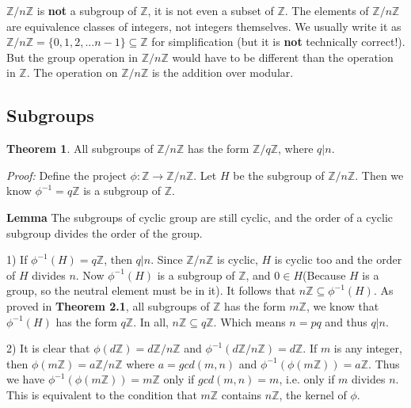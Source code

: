 \documentclass{article}
\theoremstyle{definition}
\newtheorem{theorem}{Theorem}[section]
\begin{document}
$\mathbb{Z}/n\mathbb{Z}$ is \textbf{not} a subgroup of $\mathbb{Z}$, it is not even a subset of $\mathbb{Z}$. The elements of $\mathbb{Z}/n\mathbb{Z}$ are equivalence classes of integers, not integers themselves. We usually write it as $\mathbb{Z}/n\mathbb{Z}=\{0,1,2,...n-1\} \subseteq \mathbb{Z}$ for simplification (but it is \textbf{not} technically correct!). But the group operation in $\mathbb{Z}/n\mathbb{Z}$ would have to be different than the operation in $\mathbb{Z}$. The operation on $\mathbb{Z}/n\mathbb{Z}$ is the addition over modular.

\subsection{Subgroups}

\begin{theorem}
All subgroups of $\mathbb{Z}/n\mathbb{Z}$ has the form $\mathbb{Z}/q\mathbb{Z}$, where $q|n$.

\textit{Proof:} Define the project $\phi: \mathbb{Z} \to \mathbb{Z}/n\mathbb{Z}$. Let $H$ be the subgroup of $\mathbb{Z}/n\mathbb{Z}$. Then we know $\phi^{-1}=q\mathbb{Z}$ is a subgroup of $\mathbb{Z}$.

\textbf{Lemma} The subgroups of cyclic group are still cyclic, and the order of a cyclic subgroup divides the order of the group. 

1) If $\phi^{-1}(H)=q\mathbb{Z}$, then $q|n$. Since $\mathbb{Z}/n\mathbb{Z}$ is cyclic, $H$ is cyclic too and the order of $H$ divides $n$. Now $\phi^{-1}(H)$ is a subgroup of $\mathbb{Z}$, and $0\in H$(Because $H$ is a group, so the neutral element must be in it). It follows that $n\mathbb{Z} \subseteq \phi^{-1}(H)$. As proved in \textbf{Theorem 2.1}, all subgroups of $\mathbb{Z}$ has the form $m\mathbb{Z}$, we know that $\phi^{-1}(H)$ has the form $q\mathbb{Z}$. In all, $n\mathbb{Z} \subseteq q \mathbb{Z}$. Which means $n = pq$ and thus $q|n$.

2) It is clear that $\phi(d\mathbb{Z}) = d\mathbb{Z}/n\mathbb{Z}$ and $\phi^{-1}(d\mathbb{Z}/n\mathbb{Z}) = d\mathbb{Z}$. If $m$ is any integer, then $\phi(m\mathbb{Z})=a\mathbb{Z}/n\mathbb{Z}$ where $a=gcd(m,n)$ and $\phi^{-1}(\phi(m\mathbb{Z}))=a\mathbb{Z}$. Thus we have $\phi^{-1}(\phi(m\mathbb{Z}))=m\mathbb{Z}$ only if $gcd(m,n)=m$, i.e. only if $m$ divides $n$. This is equivalent to the condition that $m\mathbb{Z}$ contains $n\mathbb{Z}$, the kernel of $\phi$. 

\end{theorem}
\end{document}
